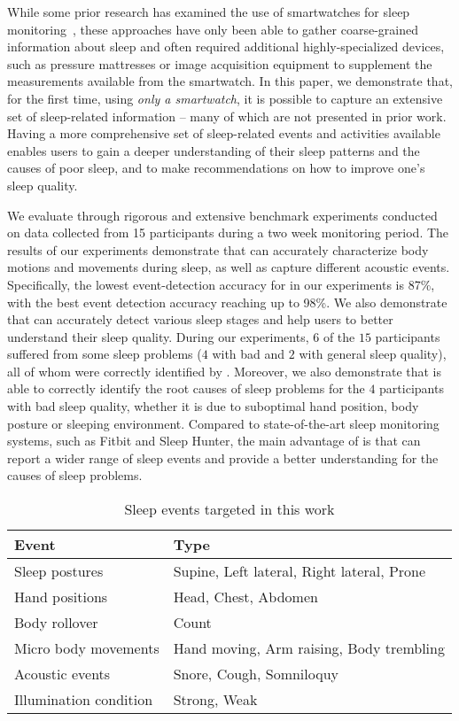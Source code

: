 While some prior research has examined the use of smartwatches for sleep
monitoring~\cite{pombo2016ubisleep,shelgikar2016sleep,haescher2015anomaly,borazio2012combining}, these approaches have only been able to
gather coarse-grained information about sleep and often required additional highly-specialized devices, such as pressure mattresses or
image acquisition equipment to supplement the measurements available from the smartwatch. In this paper, we demonstrate that, for the first
time, using {\em only a smartwatch}, it is possible to capture an extensive set of sleep-related information -- many of which are not
presented in prior work. Having a more comprehensive set of sleep-related events and activities available enables users to gain a deeper
understanding of their sleep patterns and the causes of poor sleep, and to make recommendations on how to improve one's sleep quality.

We evaluate {\systemname} through rigorous and extensive benchmark experiments conducted on data collected from 15 participants during a
two week monitoring period. The results of our experiments demonstrate that {\systemname} can accurately characterize body motions and
movements during sleep, as well as capture different acoustic events. Specifically, the lowest event-detection accuracy for {\systemname}
in our experiments is 87\%, with the best event detection accuracy reaching up to 98\%. We also demonstrate that {\systemname} can
accurately detect various sleep stages and help users to better understand their sleep quality. During our experiments, $6$ of the $15$
participants suffered from some sleep problems ($4$ with bad and $2$ with general sleep quality), all of whom were correctly identified by
{\systemname}. Moreover, we also demonstrate that {\systemname} is able to correctly identify the root causes of sleep problems for the $4$
participants with bad sleep quality, whether it is due to suboptimal hand position, body posture or sleeping environment. Compared to
state-of-the-art sleep monitoring systems, such as Fitbit and Sleep Hunter, the main advantage of {\systemname} is that can report a wider
range of sleep events and provide a better understanding for the causes of sleep problems.

\begin{table}[!t]
 \caption{\label{tab:test}Sleep events targeted in this work}
 \centering
 \small
 \begin{tabular}{ll}
  \toprule
  \textbf{Event}& \textbf{Type} \\
  \midrule
\rowcolor{Gray}  Sleep postures & Supine, Left lateral, Right lateral, Prone\\
 Hand positions & Head, Chest, Abdomen\\
\rowcolor{Gray} Body rollover & Count\\
 Micro body movements& Hand moving, Arm raising, Body trembling \\
\rowcolor{Gray} Acoustic events & Snore, Cough, Somniloquy  \\
 Illumination condition & Strong, Weak  \\
  \bottomrule
 \end{tabular}
\end{table}


